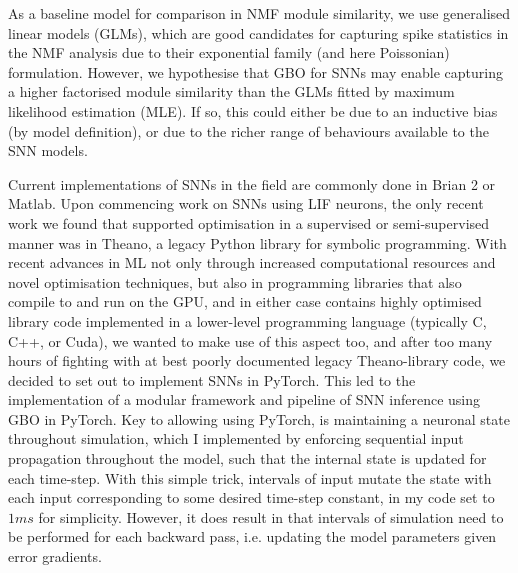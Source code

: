 \documentclass[mphil,deptreport,ianc]{infthesis} %
\begin{document}
As a baseline model for comparison in NMF module similarity, we use generalised linear models (GLMs), which are good candidates for capturing spike statistics in the NMF analysis due to their exponential family (and here Poissonian) formulation.
However, we hypothesise that GBO for SNNs may enable capturing a higher factorised module similarity than the GLMs fitted by maximum likelihood estimation (MLE).
If so, this could either be due to an inductive bias (by model definition), or due to the richer range of behaviours available to the SNN models.


Current implementations of SNNs in the field are commonly done in Brian 2 or Matlab. 
Upon commencing work on SNNs using LIF neurons, the only recent work we found that supported optimisation in a supervised or semi-supervised manner was in Theano, a legacy Python library for symbolic programming.
With recent advances in ML not only through increased computational resources and novel optimisation techniques, but also in programming libraries that also compile to and run on the GPU, and in either case contains highly optimised library code implemented in a lower-level programming language (typically C, C++, or Cuda), we wanted to make use of this aspect too, and after too many hours of fighting with at best poorly documented legacy Theano-library code, we decided to set out to implement SNNs in PyTorch.
This led to the implementation of a modular framework and pipeline of SNN inference using GBO in PyTorch.
Key to allowing using PyTorch, is maintaining a neuronal state throughout simulation, which I implemented by enforcing sequential input propagation throughout the model, such that the internal state is updated for each time-step.
With this simple trick, intervals of input mutate the state with each input corresponding to some desired time-step constant, in my code set to $1 \si{ms}$ for simplicity.
However, it does result in that intervals of simulation need to be performed for each backward pass, i.e. updating the model parameters given error gradients.
\end{document}

